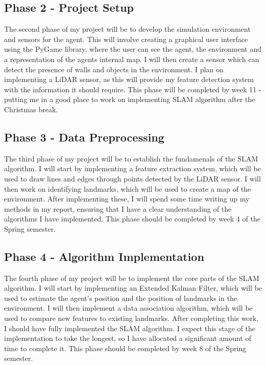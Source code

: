 \documentclass[12pt]{article}
\begin{document}
\subsection{Phase 2 - Project Setup}
The second phase of my project will be to develop the simulation environment and sensors for the agent. This will involve
creating a graphical user interface using the PyGame library, where the user can see the agent, the environment and a
representation of the agents internal map. I will then create a sensor which can detect the presence of walls and objects
in the environment. I plan on implementing a LiDAR sensor, as this will provide my feature detection system with the information
it should require. This phase will be completed by week 11 - putting me in a good place to work on implementing SLAM algorithm
after the Christmas break.

\subsection{Phase 3 - Data Preprocessing}
The third phase of my project will be to establish the fundamenals of the SLAM algorithm. I will start by implementing a feature
extraction system, which will be used to draw lines and edges through points detected by the LiDAR sensor. I will then work on
identifying landmarks, which will be used to create a map of the environment. After implementing these, I will spend some time
writing up my methods in my report, ensuring that I have a clear understanding of the algorithms I have implemented. This phase
should be completed by week 4 of the Spring semester.

\subsection{Phase 4 - Algorithm Implementation}
The fourth phase of my project will be to implement the core parts of the SLAM algorithm. I will start by implementing an Extended
Kalman Filter, which will be used to estimate the agent's position and the position of landmarks in the environment. I will then
implement a data association algorithm, which will be used to compare new features to existing landmarks. After completing this
work, I should have fully implemented the SLAM algorithm. I expect this stage of the implementation to take the longest, so I have
allocated a significant amount of time to complete it. This phase should be completed by week 8 of the Spring semester.
\end{document}
